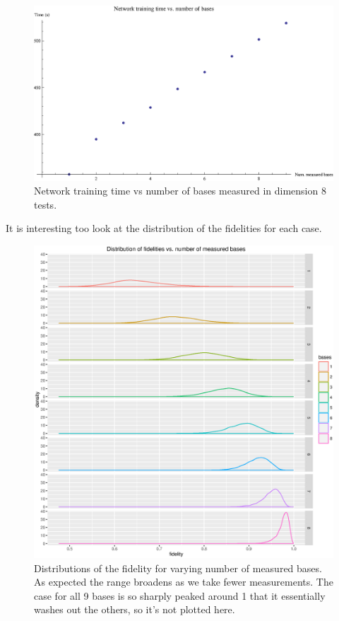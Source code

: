 \documentclass[a4paper,10pt]{article}
\begin{document}
\begin{figure}
 \includegraphics[scale=0.8]{dim8_training_time.eps}
 \caption{Network training time vs number of bases measured in dimension 8 tests.}
 \label{fig:dim8_training_time}
\end{figure}

It is interesting too look at the distribution of the fidelities for each case.

\begin{figure}
 \includegraphics[scale=0.6]{dim8_fidelity_distributions}
 \caption{Distributions of the fidelity for varying number of measured bases. As expected the range broadens as we take fewer measurements. The case for all 9 bases is so sharply peaked around 1 that it essentially washes out the others, so it's not plotted here.}
 \label{fig:dim8_fidelity_distributions}
\end{figure}
\end{document}
